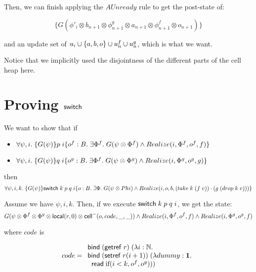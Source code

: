 \documentclass{article}
\begin{document}
Then, we can finish applying the $AUnready$ rule to get the post-state of:

$$\{G(\phi'_i \otimes b_{n+1} \otimes \phi^g_{n+1} 
   \otimes a_{n+1} \otimes \phi^f_{n+1} \otimes o_{n+1})\}$$

and an update set of $u_i \cup \{{a,b,o}\} \cup u^f_n \cup u^g_n$, which is what
we want. 

Notice that we implicitly used the disjointness of the different parts of the
cell heap here. 

\section{Proving $\mbox{\textsf{{switch}}}\;$}

We want to show that if 

\begin{itemize}
\item $\forall \psi, i.\; \{{G(\psi)}\}{p\;i}\{{o^f:B}.\;{\exists \Phi^f.\;G(\psi \otimes \Phi^f) \land 
                                 Realize(i, \Phi^f, o^f, f)}\}$
\item $\forall \psi, i.\; \{{G(\psi)}\}{q\;i}\{{o^g:B}.\;{\exists \Phi^f.\;G(\psi \otimes \Phi^g) \land 
                                 Realize(i, \Phi^g, o^g, g)}\}$
\end{itemize}

then 
\begin{displaymath}
\forall \psi, i, k.\; \{{G(\psi)}\}{\mbox{\textsf{{switch}}}\; k\;p\;q\;i}\{{o:B}.\;{\exists \Phi.\; G(\psi \otimes Phi) \land
                                  Realize(i, o, b, (take\;k\;(f\;v)) \cdot (g\;(drop\;k\;v)))}\}
\end{displaymath}

Assume we have $\psi, i, k$. Then, if we execute $\mbox{\textsf{{switch}}}\; k\;p\;q\;i$, we get the state:
\begin{displaymath}
  G(\psi \otimes \Phi^f \otimes \Phi^g \otimes \mbox{\textsf{{local}}}({r}, {0}) \otimes \mbox{\textsf{{cell}}}^{-}({o}, {code}, {\_}, {\_})) \land
    Realize(i, \Phi^f, o^f, f) \land Realize(i, \Phi^g, o^g, f)
\end{displaymath}

where $code$ is 

\begin{displaymath}
code = \begin{array}{l}
              \mbox{\textsf{{bind}}}\; (\mbox{\textsf{{getref}}}\; r)\; (\lambda i:\mathbb{N}. \\ 
              \mbox{\textsf{{bind}}}\; (\mbox{\textsf{{setref}}}\; r (i+1))\; (\lambda dummy:\mathbf{1}. \\
              \;\;\mbox{\textsf{{read}}}\; \mbox{if}(i < k, o^f, o^g))) \\
       \end{array}
\end{displaymath}
\end{document}
